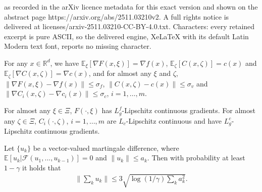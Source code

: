 \documentclass[10pt,a4paper]{amsart}
\newcommand{\E}{\mathbb{E}}
\newcommand{\R}{\mathbb{R}}
\begin{document}
as recorded in the arXiv licence metadata for this exact version and shown on the abstract page https://arxiv.org/abs/2511.03210v2. A full rights notice is delivered at licenses/arxiv-2511.03210-CC-BY-4.0.txt. Characters: every retained excerpt is pure ASCII, so the delivered engine, XeLaTeX with its default Latin Modern text font, reports no missing character.
\begin{assumption}\label{ass:stochastic}
{For any $x \in \R^d$, we have $\E_\xi[\nabla F(x,\xi)] = \nabla f(x)$, $\E_\zeta[C(x,\zeta)] = c(x)$ and $\E_\zeta[\nabla C(x,\zeta)] = \nabla c(x)$, and for almost {any} $\xi$ and $\zeta$, \(\|\nabla F(x,\xi) - \nabla f(x)\| \leq \sigma_f\), \(\|C(x,\zeta) - c(x)\| \leq \sigma_v\) and \(\|\nabla C_i(x,\zeta) - \nabla c_i(x)\| \leq \sigma_c\), $i=1,\ldots,m$.} 
\end{assumption}

\begin{assumption}\label{ass:ms}
For almost any $\xi\in \Xi$, $F(\cdot,\xi)$ has $L_g^f$-Lipschitz continuous gradients. For almost any  $\zeta\in \Xi$, $C_i(\cdot,\zeta)$, \(i = 1,\ldots,m\) are $L_c $-Lipschitz continuous and have  $L_g^c$-Lipschitz continuous gradients.
\end{assumption}

\begin{lemma}\label{lm:vazuma}
Let $\{u_k\}$ be a vector-valued martingale difference, where $\E[u_k|\mathcal F(u_1,...,u_{k-1})] = 0$ and $\|u_k\| \leq a_k$. Then with probability at least $1-\gamma$ it holds that
\begin{align*}
    \bigg\|\sum_k u_k\bigg\| \leq 3\sqrt{\log(1/\gamma)\sum_k a_k^2}.
\end{align*}
\end{lemma}
\end{document}
